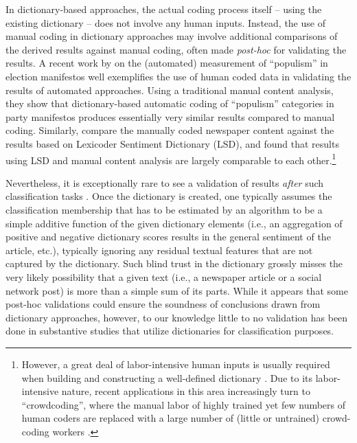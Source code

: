 \documentclass[man, 12pt, a4paper, nolmodern, noextraspace]{apa6}
\begin{document}
    In dictionary-based approaches, the actual coding process itself -- using the existing dictionary -- does not involve any human inputs. Instead, the use of manual coding in dictionary approaches may involve additional comparisons of the derived results against manual coding, often made \textit{post-hoc} for validating the results. A recent work by \textcite{Rooduijn2011} on the (automated) measurement of \enquote{populism} in election manifestos well exemplifies the use of human coded data in validating the results of automated approaches. Using a traditional manual content analysis, they show that dictionary-based automatic coding of \enquote{populism} categories in party manifestos produces essentially very similar results compared to manual coding. Similarly, \textcite{YoungSoroka2012} compare the manually coded newspaper content against the results based on Lexicoder Sentiment Dictionary (LSD), and found that results using LSD and manual content analysis are largely comparable to each other.\footnote{ However, a great deal of labor-intensive human inputs is usually required when building and constructing a well-defined dictionary \parencite{YoungSoroka2012, muddiman2018re}. Due to its labor-intensive nature, recent applications in this area increasingly turn to \enquote{crowdcoding}, where the manual labor of highly trained yet few numbers of human coders are replaced with a large number of (little or untrained) crowd-coding workers \parencites[][]{haselmayer2017sentiment, lind2017content}.} 
    
    Nevertheless, it is exceptionally rare to see a validation of results \textit{after} such classification tasks \parencites[yet for notable exceptions, see][]{muddiman2018re, YoungSoroka2012, gonzalez2015signals}. Once the dictionary is created, one typically assumes the classification membership that has to be estimated by an algorithm to be a simple additive function of the given dictionary elements (i.e., an aggregation of positive and negative dictionary scores results in the general sentiment of the article, etc.), typically ignoring any residual textual features that are not captured by the dictionary. Such blind trust in the dictionary grossly misses the very likely possibility that a given text (i.e., a newspaper article or a social network post) is more than a simple sum of its parts. While it appears that some post-hoc validations could ensure the soundness of conclusions drawn from dictionary approaches, however, to our knowledge little to no validation has been done in substantive studies that utilize dictionaries for classification purposes.
    
\end{document}
